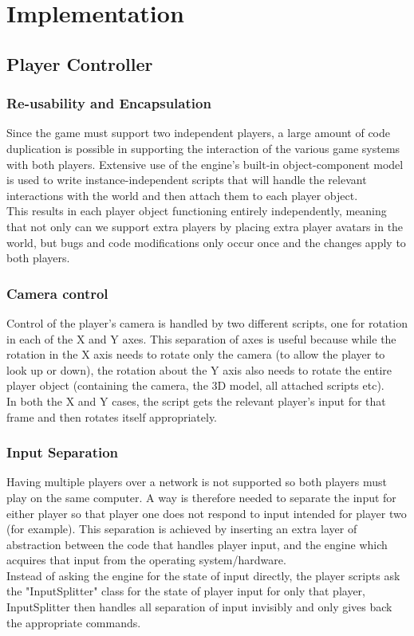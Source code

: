 \documentclass[11pt,a4paper]{article}
\begin{document}
\section{Implementation}
\label{s:implementation}
\subsection{Player Controller}
\subsubsection{Re-usability and Encapsulation}
Since the game must support two independent players, a large amount of code duplication is possible in supporting the interaction of the various game systems with both players. Extensive use of the engine's built-in object-component model is used to write instance-independent scripts that will handle the relevant interactions with the world and then attach them to each player object. \\
This results in each player object functioning entirely independently, meaning that not only can we support extra players by placing extra player avatars in the world, but bugs and code modifications only occur once and the changes apply to both players.
\subsubsection{Camera control}
Control of the player's camera is handled by two different scripts, one for rotation in each of the X and Y axes. This separation of axes is useful because while the rotation in the X axis needs to rotate only the camera (to allow the player to look up or down), the rotation about the Y axis also needs to rotate the entire player object (containing the camera, the 3D model, all attached scripts etc). \\
In both the X and Y cases, the script gets the relevant player's input for that frame and then rotates itself appropriately.
\subsubsection{Input Separation}
Having multiple players over a network is not supported so both players must play on the same computer. A way is therefore needed to separate the input for either player so that player one does not respond to input intended for player two (for example). This separation is achieved by inserting an extra layer of abstraction between the code that handles player input, and the engine which acquires that input from the operating system/hardware. \\
Instead of asking the engine for the state of input directly, the player scripts ask the "InputSplitter" class for the state of player input for only that player, InputSplitter then handles all separation of input invisibly and only gives back the appropriate commands.
\end{document}
